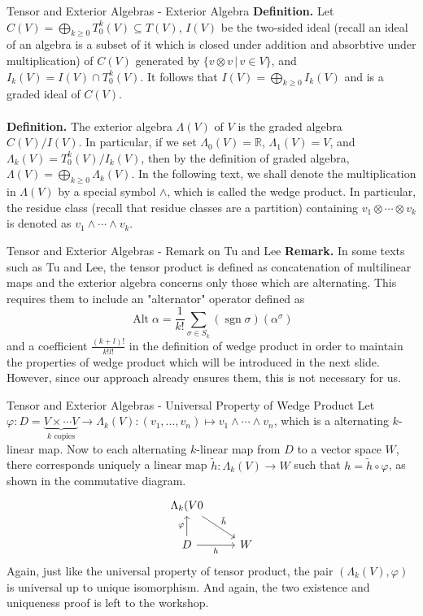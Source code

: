 \documentclass[aspectratio=169]{beamer}
\begin{document}
\begin{frame}{Tensor and Exterior Algebras - Exterior Algebra}
\textbf{Definition.} Let $C(V)=\bigoplus_{k\geq0}T^k_0(V)\subseteq T(V)$, $I(V)$ be the two-sided ideal (recall an ideal of an algebra is a subset of it which is closed under addition and absorbtive under multiplication) of $C(V)$ generated by $\{v\otimes v\,|\,v\in V\}$, and $I_k(V)=I(V)\cap T^k_0(V)$. It follows that $I(V)=\bigoplus_{k\geq0}I_k(V)$ and is a graded ideal of $C(V)$.
\\~\\
\textbf{Definition.} The \alert{exterior algebra} $\Lambda(V)$ of $V$ is the graded algebra $C(V)/I(V)$. In particular, if we set $\Lambda_0(V)=\mathbb{R}$, $\Lambda_1(V)=V$, and $\Lambda_k(V)=T^k_0(V)/I_k(V)$, then by the definition of graded algebra, $\Lambda(V)=\bigoplus_{k\geq0}\Lambda_k(V)$. In the following text, we shall denote the multiplication in $\Lambda(V)$ by a special symbol $\wedge$, which is called the \alert{wedge product}. In particular, the residue class (recall that residue classes are a partition) containing $v_1\otimes\cdots\otimes v_k$ is denoted as $v_1\wedge\cdots\wedge v_k$.
\end{frame}
\begin{frame}{Tensor and Exterior Algebras - Remark on Tu and Lee}
\textbf{Remark.} In some texts such as Tu and Lee, the tensor product is defined as concatenation of multilinear maps and the exterior algebra concerns only those which are alternating. This requires them to include an "alternator" operator defined as $$\operatorname{Alt}\alpha=\frac{1}{k!}\sum_{\sigma\in S_k}(\operatorname{sgn}\sigma)(\alpha^\sigma)$$ and a coefficient $\frac{(k+l)!}{k!l!}$ in the definition of wedge product in order to maintain the properties of wedge product which will be introduced in the next slide. However, since our approach already ensures them, this is not necessary for us.
\end{frame}
\begin{frame}{Tensor and Exterior Algebras - Universal Property of Wedge Product}
Let $\varphi:D=\underbrace{V\times\cdots V}_{k\text{ copies}}\to\Lambda_k(V):(v_1,\dots,v_n)\mapsto v_1\wedge\cdots\wedge v_n$, which is a alternating $k$-linear map. Now to each alternating $k$-linear map from $D$ to a vector space $W$, there corresponds uniquely a linear map $\tilde{h}:\Lambda_k(V)\to W$ such that $h=\tilde{h}\circ\varphi$, as shown in the commutative diagram.
$$
\begin{tikzcd}[ampersand replacement=\&]
\Lambda_k(V0 \arrow[rd, "\tilde{h}"]                                                  \& {}  \\
D \arrow[u, "\varphi"] \arrow[r, "h"'] \& W
\end{tikzcd}
$$
Again, just like the universal property of tensor product, the pair $(\Lambda_k(V),\varphi)$ is universal up to unique isomorphism. And again, the two existence and uniqueness proof is left to the workshop.
\end{frame}
\end{document}
